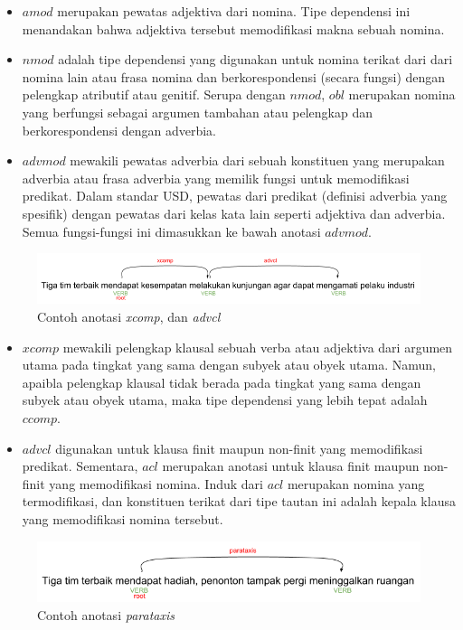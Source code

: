 \begin{itemize}
\item $amod$ merupakan pewatas adjektiva dari nomina. Tipe dependensi ini menandakan bahwa adjektiva tersebut memodifikasi makna sebuah nomina.
\item $nmod$ adalah tipe dependensi yang digunakan untuk nomina terikat dari dari nomina lain atau frasa nomina dan berkorespondensi (secara fungsi) dengan pelengkap atributif atau genitif. Serupa dengan $nmod$, $obl$ merupakan nomina yang berfungsi sebagai argumen tambahan atau pelengkap dan berkorespondensi dengan adverbia. 
\item $advmod$ mewakili pewatas adverbia dari sebuah konstituen yang merupakan adverbia atau frasa adverbia yang memilik fungsi untuk memodifikasi predikat. Dalam standar USD, pewatas dari predikat (definisi adverbia yang spesifik) dengan pewatas dari kelas kata lain seperti adjektiva dan adverbia. Semua fungsi-fungsi ini dimasukkan ke bawah anotasi $advmod$. 
\end{itemize}

\begin{figure}
	\centering \includegraphics[width=1
	\textwidth] {pics/anotasixcomp.png} \caption{Contoh anotasi \textit{xcomp}, dan \textit{advcl}} 
\label{fig:anotasixcomp} 
\end{figure}

\begin{itemize}
\item $xcomp$ mewakili pelengkap klausal sebuah verba atau adjektiva dari argumen utama pada tingkat yang sama dengan subyek atau obyek utama. Namun, apaibla pelengkap klausal tidak berada pada tingkat yang sama dengan subyek atau obyek utama, maka tipe dependensi yang lebih tepat adalah $ccomp$.
\item  $advcl$ digunakan untuk klausa finit maupun non-finit yang memodifikasi predikat. Sementara, $acl$ merupakan anotasi untuk klausa finit maupun non-finit yang memodifikasi nomina. Induk dari $acl$ merupakan nomina yang termodifikasi, dan konstituen terikat dari tipe tautan ini adalah kepala klausa yang memodifikasi nomina tersebut.
\end{itemize}

\begin{figure}
	\centering \includegraphics[width=0.9
	\textwidth] {pics/anotasiparataxis.png} \caption{Contoh anotasi \textit{parataxis}} 
\label{fig:anotasiparataxis} 
\end{figure}

